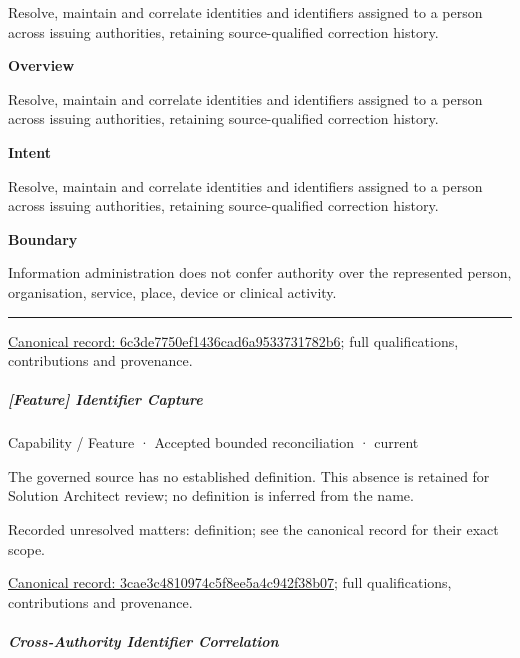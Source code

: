Resolve, maintain and correlate identities and identifiers assigned to a person across issuing authorities, retaining source-qualified correction history.



\textbf{Overview}



Resolve, maintain and correlate identities and identifiers assigned to a person across issuing authorities, retaining source-qualified correction history.



\textbf{Intent}



Resolve, maintain and correlate identities and identifiers assigned to a person across issuing authorities, retaining source-qualified correction history.



\textbf{Boundary}



Information administration does not confer authority over the represented person, organisation, service, place, device or clinical activity.



\medskip\hrule\medskip

{\footnotesize \href{../../../../continuum/strategy/capability/6c3de7750ef1436cad6a9533731782b6.md}{Canonical record: 6c3de7750ef1436cad6a9533731782b6}; full qualifications, contributions and provenance.}\par
\subparagraph{[Feature] Identifier Capture}


\label{element:3cae3c4810974c5f8ee5a4c942f38b07}
{\small Capability / Feature · Accepted bounded reconciliation · current}\par

The governed source has no established definition. This absence is retained for Solution Architect review; no definition is inferred from the name.


{\small Recorded unresolved matters: definition; see the canonical record for their exact scope.}\par
{\footnotesize \href{../../../../continuum/strategy/capability/feature/3cae3c4810974c5f8ee5a4c942f38b07.md}{Canonical record: 3cae3c4810974c5f8ee5a4c942f38b07}; full qualifications, contributions and provenance.}\par
\subparagraph{Cross-Authority Identifier Correlation}

